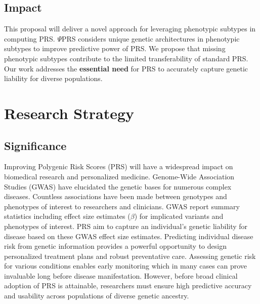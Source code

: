 \documentclass[11pt]{article}  %
\begin{document}
\subsection*{Impact}
This proposal will deliver a novel approach for leveraging phenotypic subtypes in computing PRS. $\Psi$PRS considers unique genetic architectures in phenotypic subtypes to improve predictive power of PRS. We propose that missing phenotypic subtypes contribute to the limited transferability of standard PRS. Our work addresses the \textbf{essential need} for PRS to accurately capture genetic liability for diverse populations.         

\newpage
\section*{Research Strategy}

\subsection*{Significance}





\hspace{10mm}Improving Polygenic Risk Scores (PRS) will have a widespread impact on biomedical research and personalized medicine. Genome-Wide Association Studies (GWAS) have elucidated the genetic bases for numerous complex diseases. Countless associations have been made between genotypes and phenotypes of interest to researchers and clinicians. GWAS report summary statistics including effect size estimates ($\beta$) for implicated variants and phenotypes of interest. PRS aim to capture an individual's genetic liability for disease based on these GWAS effect size estimates. Predicting individual disease risk from genetic information provides a powerful opportunity to design personalized treatment plans and robust preventative care. Assessing genetic risk for various conditions enables early monitoring which in many cases can prove invaluable long before disease manifestation. However, before broad clinical adoption of PRS is attainable, researchers must ensure high predictive accuracy and usability across populations of diverse genetic ancestry.
\end{document}
